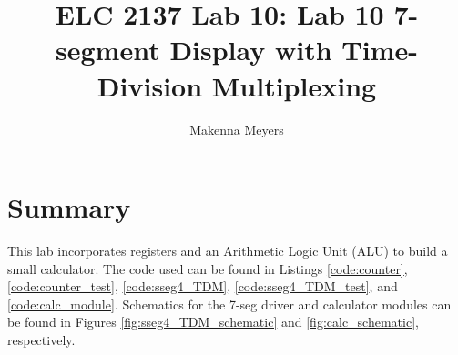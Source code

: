 \documentclass[11pt]{article}
\begin{document}
\title{ELC 2137 Lab 10: Lab 10 7-segment Display with Time-Division Multiplexing}
\author{Makenna Meyers}

\maketitle


\section*{Summary}
 This lab incorporates registers and an Arithmetic Logic Unit (ALU) to build a small calculator. The code used can be found in Listings \ref{code:counter}, \ref{code:counter_test}, \ref{code:sseg4_TDM}, \ref{code:sseg4_TDM_test}, and \ref{code:calc_module}. Schematics for the 7-seg driver and calculator modules can be found in Figures \ref{fig:sseg4_TDM_schematic} and \ref{fig:calc_schematic}, respectively. 
 
\end{document}
